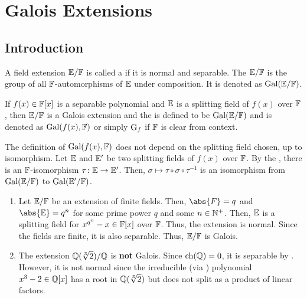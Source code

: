\section{Galois Extensions}

\subsection{Introduction}

\begin{defn}
    A field extension $\mathbb{E}/\mathbb{F}$ is called a  if it is normal and separable. The  $\mathbb{E}/\mathbb{F}$ is the group of all $\mathbb{F}$-automorphisms of $\mathbb{E}$ under composition. It is denoted as $\operatorname{Gal}(\mathbb{E}/\mathbb{F})$.
    
    If $f(x) \in \mathbb{F}[x]$ is a separable polynomial and $\mathbb{E}$ is a splitting field of $f(x)$ over $\mathbb{F}$, then $\mathbb{E}/\mathbb{F}$ is a Galois extension and the  is defined to be $\operatorname{Gal}(\mathbb{E}/\mathbb{F})$ and is denoted as $\operatorname{Gal}(f(x), \mathbb{F})$ or simply $\operatorname{G}_f$ if $\mathbb{F}$ is clear from context.
\end{defn}

\begin{rem}
    The definition of $\operatorname{Gal}(f(x), \mathbb{F})$ does not depend on the splitting field chosen, up to isomorphism. Let $\mathbb{E}$ and $\mathbb{E}^{\prime}$ be two splitting fields of $f(x)$ over $\mathbb{F}$. By the , there is an $\mathbb{F}$-isomorphism $\tau \colon \mathbb{E} \to \mathbb{E}^{\prime}$. Then, $\sigma \mapsto \tau \circ \sigma \circ \tau^{-1}$ is an isomorphism from $\operatorname{Gal}(\mathbb{E}/\mathbb{F})$ to $\operatorname{Gal}(\mathbb{E}^{\prime}/\mathbb{F})$.
\end{rem}

\begin{ex}
    \phantom{hi}
    \begin{enumerate}
        \item Let $\mathbb{E}/\mathbb{F}$ be an extension of finite fields. Then, $\abs{F} = q$ and $\abs{\E} = q^n$ for some prime power $q$ and some $n \in \mathbb{N}^+$. Then, $\mathbb{E}$ is a splitting field for $x^{q^n} - x \in \mathbb{F}[x]$ over $\mathbb{F}$. Thus, the extension is normal. Since the fields are finite, it is also separable. Thus, $\mathbb{E}/\mathbb{F}$ is Galois. 
        
        \item The extension $\mathbb{Q}(\sqrt[3]{2}) / \mathbb{Q}$ is \textbf{not} Galois. Since $\operatorname{ch}(\mathbb{Q}) = 0$, it is separable by . However, it is not normal since the irreducible (via ) polynomial $x^3 - 2 \in \mathbb{Q}[x]$ has a root in $\mathbb{Q}(\sqrt[3]{2})$ but does not split as a product of linear factors.
    \end{enumerate}
\end{ex}

